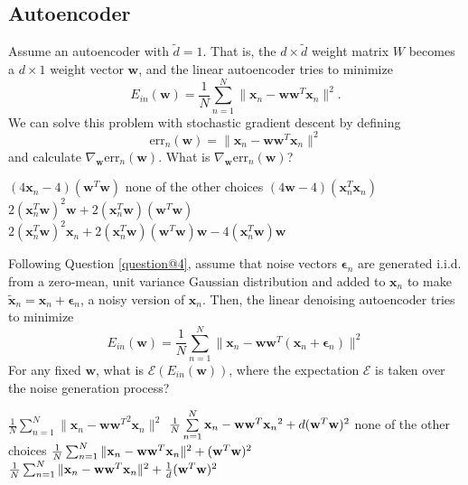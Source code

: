 \documentclass[a4paper,10pt]{exam}
\begin{document}
\begin{questions}
	\section*{Autoencoder}
	\question
	Assume an autoencoder with $\tilde{d} = 1$. That is, the $d \times \tilde{d}$ weight matrix $W$ becomes a $d \times 1$ weight vector $\mathbf{w}$, and the linear autoencoder tries to minimize
	\[E_{in}(\mathbf{w}) = \frac{1}{N} \sum_{n=1}^N \|\mathbf{x}_n - \mathbf{w} \mathbf{w}^T \mathbf{x}_n\|^2.\]
	We can solve this problem with stochastic gradient descent by defining
	\[\text{err}_n(\mathbf{w}) = \|\mathbf{x}_n - \mathbf{w} \mathbf{w}^T \mathbf{x}_n\|^2\]
	and calculate $\nabla_\mathbf{w} \text{err}_n(\mathbf{w})$. What is $\nabla_\mathbf{w} \text{err}_n(\mathbf{w})$?
	\begin{checkboxes}
		\choice $(4 \mathbf{x}_n - 4) (\mathbf{w}^T \mathbf{w})$
		\choice none of the other choices
		\choice $(4 \mathbf{w} - 4) (\mathbf{x}_n^T \mathbf{x}_n)$
		\CorrectChoice $2 (\mathbf{x}_n^T \mathbf{w})^2 \mathbf{w} + 2 (\mathbf{x}_n^T \mathbf{w}) (\mathbf{w}^T \mathbf{w})$
		\choice $2 (\mathbf{x}_n^T \mathbf{w})^2 \mathbf{x}_n + 2 (\mathbf{x}_n^T \mathbf{w}) (\mathbf{w}^T \mathbf{w}) \mathbf{w} - 4 (\mathbf{x}_n^T \mathbf{w}) \mathbf{w}$\\
	\end{checkboxes}

	\question Following Question \ref{question@4}, assume that noise vectors ${\boldsymbol\epsilon}_n$ are generated i.i.d. from a zero-mean, unit variance Gaussian distribution and added to $\mathbf{x}_n$ to make $\tilde{\mathbf{x}}_n = \mathbf{x}_n + {\boldsymbol\epsilon}_n$, a noisy version of $\mathbf{x}_n$. Then, the linear denoising autoencoder tries to minimize
	\[E_{in}(\mathbf{w}) = \frac{1}{N} \sum_{n=1}^N \|\mathbf{x}_n - \mathbf{w} \mathbf{w}^T (\mathbf{x}_n + {\boldsymbol\epsilon}_n)\| ^2\]
	For any fixed $\mathbf{w}$, what is $\mathcal{E}\left(E_{in}(\mathbf{w})\right)$, where the expectation $\mathcal{E}$ is taken over the noise generation process?
	\begin{checkboxes}
		\choice $\frac{1}{N} \sum_{n=1}^N \|\mathbf{x}_n - {\mathbf{w} \mathbf{w}^T}^2 \mathbf{x}_n\|^2$
		\choice $\frac{1}{N}\sum\limits_{n = 1}^N {{{\bf{x}}_n} - {\bf{w}}{{\bf{w}}^T}{{\bf{x}}_n}{^2}}  + d{({{\bf{w}}^T}{\bf{w}})^2}$
		\choice none of the other choices
		\CorrectChoice $\frac{1}{N} \sum_{n=1}^N \|\mathbf{x}_n - \mathbf{w} \mathbf{w}^T \mathbf{x}_n\|^2 + {({{\bf{w}}^T}{\bf{w}})^2}$
		\choice $\frac{1}{N} \sum_{n=1}^N \|\mathbf{x}_n - \mathbf{w} \mathbf{w}^T \mathbf{x}_n\|^2 + \frac{1}{d} {({{\bf{w}}^T}{\bf{w}})^2}$\\
	\end{checkboxes}


\end{questions}
\end{document}
